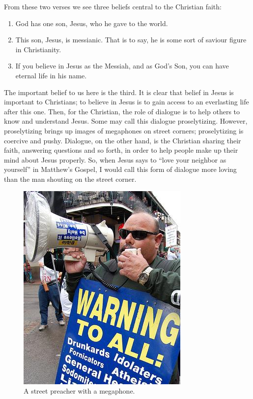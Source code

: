 \documentclass[]{article}
\providecommand{\tightlist}{%
  \setlength{\itemsep}{0pt}\setlength{\parskip}{0pt}}
\begin{document}
From these two verses we see three beliefs central to the Christian
faith:

\begin{enumerate}
\def\labelenumi{\arabic{enumi}.}
\tightlist
\item
  God has one son, Jesus, who he gave to the world.
\item
  This son, Jesus, is messianic. That is to say, he is some sort of
  saviour figure in Christianity.
\item
  If you believe in Jesus as the Messiah, and as God's Son, you can have
  eternal life in his name.
\end{enumerate}

The important belief to us here is the third. It is clear that belief in
Jesus is important to Christians; to believe in Jesus is to gain access
to an everlasting life after this one. Then, for the Christian, the role
of dialogue is to help others to know and understand Jesus. Some may
call this dialogue proselytizing. However, proselytizing brings up
images of megaphones on street corners; proselytizing is coercive and
pushy. Dialogue, on the other hand, is the Christian sharing their
faith, answering questions and so forth, in order to help people make up
their mind about Jesus properly. So, when Jesus says to ``love your
neighbor as yourself''\autocite[pg 956]{HolyBibleNew2007} in Matthew's
Gospel, I would call this form of dialogue more loving than the man
shouting on the street corner.

\begin{figure}
\centering
\includegraphics{./StreetPreaching.jpg}
\caption{A street preacher with a megaphone.}
\end{figure}
\end{document}
